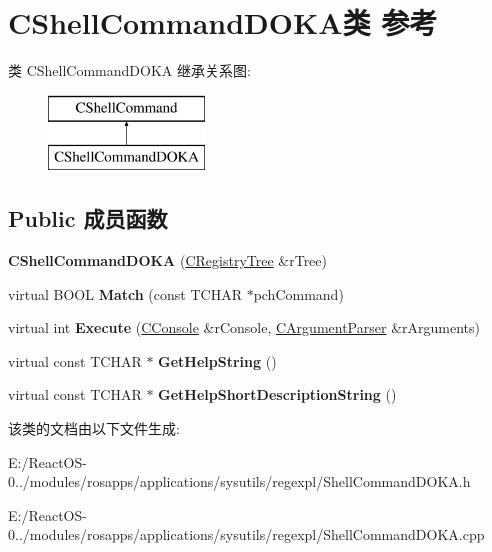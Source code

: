 \hypertarget{class_c_shell_command_d_o_k_a}{}\section{C\+Shell\+Command\+D\+O\+K\+A类 参考}
\label{class_c_shell_command_d_o_k_a}
类 C\+Shell\+Command\+D\+O\+KA 继承关系图\+:\begin{figure}[H]
\begin{center}
\leavevmode
\includegraphics[height=2.000000cm]{class_c_shell_command_d_o_k_a}
\end{center}
\end{figure}
\subsection*{Public 成员函数}
\begin{DoxyCompactItemize}
\item 
\mbox{\label{class_c_shell_command_d_o_k_a_a4ecd867699c68bac47ddf9468794a88b}} 
{\bfseries C\+Shell\+Command\+D\+O\+KA} (\hyperlink{class_c_registry_tree}{C\+Registry\+Tree} \&r\+Tree)
\item 
\mbox{\label{class_c_shell_command_d_o_k_a_afbe0f364e9b4a53c6c5695ee7fc50405}} 
virtual B\+O\+OL {\bfseries Match} (const T\+C\+H\+AR $\ast$pch\+Command)
\item 
\mbox{\label{class_c_shell_command_d_o_k_a_ada7a248b992372e5f9766a64e5125e9f}} 
virtual int {\bfseries Execute} (\hyperlink{class_c_console}{C\+Console} \&r\+Console, \hyperlink{class_c_argument_parser}{C\+Argument\+Parser} \&r\+Arguments)
\item 
\mbox{\label{class_c_shell_command_d_o_k_a_ad3daf55f73260590f42d76bd4ca5a697}} 
virtual const T\+C\+H\+AR $\ast$ {\bfseries Get\+Help\+String} ()
\item 
\mbox{\label{class_c_shell_command_d_o_k_a_ada02b8dd46a4118425f408acd20a8491}} 
virtual const T\+C\+H\+AR $\ast$ {\bfseries Get\+Help\+Short\+Description\+String} ()
\end{DoxyCompactItemize}


该类的文档由以下文件生成\+:\begin{DoxyCompactItemize}
\item 
E\+:/\+React\+O\+S-\/0../modules/rosapps/applications/sysutils/regexpl/Shell\+Command\+D\+O\+K\+A.\+h\item 
E\+:/\+React\+O\+S-\/0../modules/rosapps/applications/sysutils/regexpl/Shell\+Command\+D\+O\+K\+A.\+cpp\end{DoxyCompactItemize}

